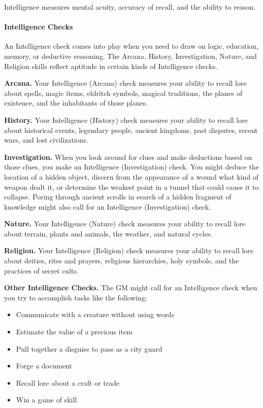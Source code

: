 \documentclass[
]{article}
\providecommand{\tightlist}{%
  \setlength{\itemsep}{0pt}\setlength{\parskip}{0pt}}
\begin{document}
Intelligence measures mental acuity, accuracy of recall, and the ability
to reason.

\hypertarget{intelligence-checks}{%
\paragraph{Intelligence Checks}\label{intelligence-checks}}

An Intelligence check comes into play when you need to draw on logic,
education, memory, or deductive reasoning. The Arcana, History,
Investigation, Nature, and Religion skills reflect aptitude in certain
kinds of Intelligence checks.

\textbf{Arcana.} Your Intelligence (Arcana) check measures your ability
to recall lore about spells, magic items, eldritch symbols, magical
traditions, the planes of existence, and the inhabitants of those
planes.

\textbf{History.} Your Intelligence (History) check measures your
ability to recall lore about historical events, legendary people,
ancient kingdoms, past disputes, recent wars, and lost civilizations.

\textbf{Investigation.} When you look around for clues and make
deductions based on those clues, you make an Intelligence
(Investigation) check. You might deduce the location of a hidden object,
discern from the appearance of a wound what kind of weapon dealt it, or
determine the weakest point in a tunnel that could cause it to collapse.
Poring through ancient scrolls in search of a hidden fragment of
knowledge might also call for an Intelligence (Investigation) check.

\textbf{Nature.} Your Intelligence (Nature) check measures your ability
to recall lore about terrain, plants and animals, the weather, and
natural cycles.

\textbf{Religion.} Your Intelligence (Religion) check measures your
ability to recall lore about deities, rites and prayers, religious
hierarchies, holy symbols, and the practices of secret cults.

\textbf{Other Intelligence Checks.} The GM might call for an
Intelligence check when you try to accomplish tasks like the following:

\begin{itemize}
\tightlist
\item
  Communicate with a creature without using words
\item
  Estimate the value of a precious item
\item
  Pull together a disguise to pass as a city guard
\item
  Forge a document
\item
  Recall lore about a craft or trade
\item
  Win a game of skill
\end{itemize}
\end{document}
